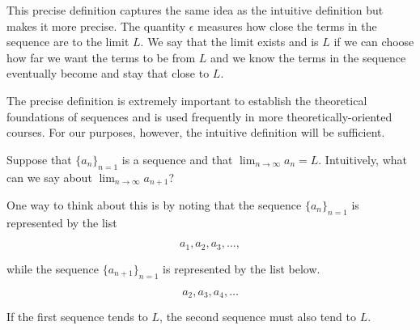 \documentclass{ximera}
\begin{document}
This precise definition captures the same idea as the intuitive definition but makes it more precise.  The quantity $\epsilon$ measures how close the terms in the sequence are to the limit $L$.  We say that the limit exists and is $L$ if we can choose how far we want the terms to be from $L$ and we know the terms in the sequence eventually become and stay that close to $L$.  

\begin{remark}
The precise definition is extremely important to establish the theoretical foundations of sequences and is used frequently in more theoretically-oriented courses.  For our purposes, however, the intuitive definition will be sufficient.
\end{remark}

\begin{question}
Suppose that $\{a_n\}_{n=1}$ is a sequence and that $\lim_{n \to \infty} a_n = L$.  Intuitively, what can we say about $\lim_{n \to \infty} a_{n+1}$? 

One way to think about this is by noting that the sequence $\{a_n\}_{n=1}$ is represented by the list

\[
a_1,a_2,a_3, \ldots ,
\]

while the sequence $\{a_{n+1}\}_{n=1}$ is represented by the list below.

\[
a_2,a_3,a_4, \ldots
\]

If the first sequence tends to $L$, the second sequence must also tend to $L$.

\end{question}
\end{document}
